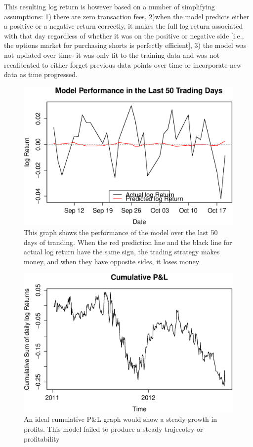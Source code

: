 \documentclass{article}
\begin{document}
This resulting log return is however based on a number of simplifying assumptions: 1) there are zero transaction fees, 2)when the model predicts either a positive or a negative return correctly, it makes the full log return associated with that day regardless of whether it was on the positive or negative side [i.e., the options market for purchasing shorts is perfectly efficient], 3) the model was not updated over time- it was only fit to the training data and was not recalibrated to either forget previous data points over time or incorporate new data as time progressed.

\begin{figure}[H]
\begin{center}
\includegraphics[width=1\columnwidth]{performance.eps}
\caption{This graph shows the performance of the model over the last 50 days of tranding.  When the red prediction line and the black line for actual log return have the same sign, the trading strategy makes money, and when they have opposite sides, it loses money}
\end{center}
\end{figure}


\begin{figure}[H]
\begin{center}
\includegraphics[width=1\columnwidth]{pl.eps}
\caption{An ideal cumulative P\&L graph would show a steady growth in profits.  This model failed to produce a steady trajecotry or profitability}
\end{center}
\end{figure}
\end{document}
